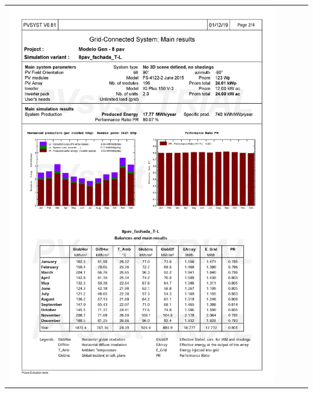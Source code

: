 \begin{table}[H]
    \centering
    \begin{tabular}{l}
        \includegraphics[width=0.9\textwidth]{figures/attachments/resultpv10.jpg}
    \end{tabular}
\end{table}
\pagebreak
